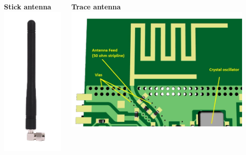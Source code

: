 \documentclass[11pt,xcolor=table,aspectratio=169]{beamer}
\begin{document}
\begin{frame}
\begin{columns}[T]
\begin{column}{.25\textwidth}
\begin{adjustbox}{max height=.3\textheight,max width=.9\textwidth}
				\end{adjustbox}
			\end{column}
			\begin{column}{.25\textwidth}
				\centering\textbf{Stick antenna}\\
				\begin{adjustbox}{max height=.3\textheight,max width=.9\textwidth}
					\includegraphics{media/stick_ant.PNG}
				\end{adjustbox}
			\end{column}
			\begin{column}{.25\textwidth}
				\centering\textbf{Trace antenna}\\
				\begin{adjustbox}{max height=.3\textheight,max width=.9\textwidth}
					\includegraphics{media/trace_ant.PNG}

\end{adjustbox}
\end{column}
\end{columns}
\end{frame}
\end{document}
